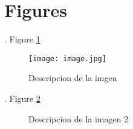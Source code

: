 \section{Figures}\label{sec:figuras}
\blindtext. Figure \ref{fig:imagen 1}

\begin{figure}[h]
    \centering
    \texttt{[image: image.jpg]}
    \caption{Descripcion de la imgen}
    \label{fig:imagen 1}
\end{figure}

\blindtext. Figure \ref{fig:imagen 2}

\begin{figure}[H]
    \centering
    \hfill

    \caption{Descripcion de la imagen 2}
    \label{fig:imagen 2}
\end{figure}
